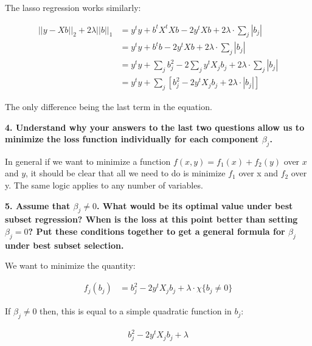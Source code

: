 \documentclass[12pt,hidelinks]{article}
\numberwithin{equation}{section}
\begin{document}
\vspace*{12pt}

The lasso regression works similarly:

\begin{align*}
|| y - X b ||_2 + 2 \lambda || b ||_1 &=
y^t y + b^t X^t X b - 2 y^t X b + 2 \lambda \cdot \sum_j | b_j | \\
&= y^t y + b^t b - 2 y^t X b + 2 \lambda \cdot \sum_j | b_j | \\
&= y^t y + \sum_j b_j^2 - 2 \sum_j y^t X_j b_j + 2 \lambda \cdot  \sum_j | b_j | \\
&= y^t y + \sum_j \left[ b_j^2 - 2 y^t X_j b_j + 2 \lambda \cdot | b_j |\right]
\end{align*}

The only difference being the last term in the equation.

\vspace*{12pt}

\textbf{4. Understand why your answers to the last two questions allow us to minimize
the loss function individually for each component $\beta_j$.}

\vspace*{12pt}

In general if we want to minimize a function $f(x, y) = f_1(x) + f_2(y)$ over
$x$ and $y$, it should be clear that all we need to do is minimize $f_1$ over x
and $f_2$ over y. The same logic applies to any number of variables.

\vspace*{12pt}

\textbf{5. Assume that $\beta_j \neq 0$. What would be its optimal value under best
subset regression? When is the loss at this point better than setting $\beta_j = 0$?
Put these conditions together to get a general formula for $\beta_j$ under best
subset selection.}

\vspace*{12pt}

We want to minimize the quantity:

\begin{align*}
f_j(b_j) &= b_j^2 - 2  y^t X_j b_j + \lambda \cdot \chi\{ b_j \neq 0 \}
\end{align*}

If $\beta_j \neq 0$ then, this is equal to a simple quadratic function in $b_j$:

\begin{align*}
b_j^2 - 2  y^t X_j b_j + \lambda
\end{align*}
\end{document}

